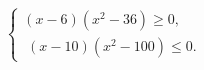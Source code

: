 \begin{ex}[type=ineq_system]
	\begin{condition}
		$\begin{cases} (x - 6)(x^2 - 36)\geqslant0,\\
			\;(x -10)(x^2 - 100)\leqslant0.
		\end{cases}$
	\end{condition}
\end{ex}